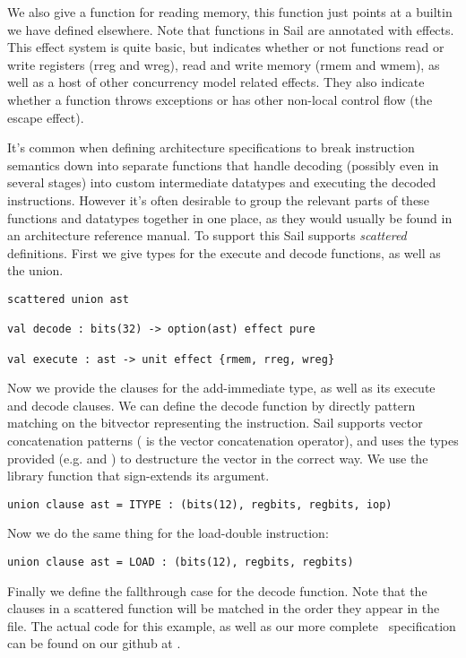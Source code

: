 
\sailoverloadXXX

We also give a function  for reading memory, this function
just points at a builtin we have defined elsewhere. Note that
functions in Sail are annotated with effects. This effect system is
quite basic, but indicates whether or not functions read or write
registers (rreg and wreg), read and write memory (rmem and wmem), as
well as a host of other concurrency model related effects. They also
indicate whether a function throws exceptions or has other non-local
control flow (the escape effect).


It's common when defining architecture specifications to break
instruction semantics down into separate functions that handle
decoding (possibly even in several stages) into custom intermediate
datatypes and executing the decoded instructions. However it's often
desirable to group the relevant parts of these functions and datatypes
together in one place, as they would usually be found in an
architecture reference manual. To support this Sail supports
\emph{scattered} definitions. First we give types for the execute and
decode functions, as well as the  union.


\begin{lstlisting}
scattered union ast

val decode : bits(32) -> option(ast) effect pure

val execute : ast -> unit effect {rmem, rreg, wreg}
\end{lstlisting}

Now we provide the clauses for the add-immediate  type, as
well as its execute and decode clauses. We can define the decode
function by directly pattern matching on the bitvector representing
the instruction. Sail supports vector concatenation patterns (
is the vector concatenation operator), and uses the types provided
(e.g.  and ) to destructure the vector in the
correct way. We use the  library function that sign-extends
its argument.

\begin{lstlisting}
union clause ast = ITYPE : (bits(12), regbits, regbits, iop)
\end{lstlisting}

\sailfclITYPEdecode
\sailfclITYPEexecute

\noindent Now we do the same thing for the load-double instruction:

\begin{lstlisting}
union clause ast = LOAD : (bits(12), regbits, regbits)
\end{lstlisting}

\sailfclLOADdecode
\sailfclLOADexecute

Finally we define the fallthrough case for the decode function. Note
that the clauses in a scattered function will be matched in the order
they appear in the file. The actual code for this example, as well as
our more complete \riscv\ specification can be found on our github at
.
